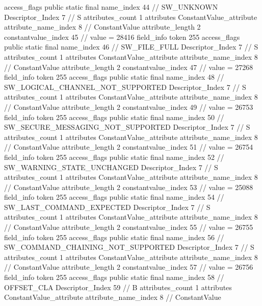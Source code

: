 {{{{{				access_flags	public static final
				name_index	44		// SW_UNKNOWN
				Descriptor_Index	7		// S
				attributes_count	1
				attributes {
				ConstantValue_attribute {
					attribute_name_index	8		// ConstantValue
					attribute_length	2
					constantvalue_index	45		// value = 28416
				}
				}
			}
			field_info {
				token	255
				access_flags	public static final
				name_index	46		// SW_FILE_FULL
				Descriptor_Index	7		// S
				attributes_count	1
				attributes {
				ConstantValue_attribute {
					attribute_name_index	8		// ConstantValue
					attribute_length	2
					constantvalue_index	47		// value = 27268
				}
				}
			}
			field_info {
				token	255
				access_flags	public static final
				name_index	48		// SW_LOGICAL_CHANNEL_NOT_SUPPORTED
				Descriptor_Index	7		// S
				attributes_count	1
				attributes {
				ConstantValue_attribute {
					attribute_name_index	8		// ConstantValue
					attribute_length	2
					constantvalue_index	49		// value = 26753
				}
				}
			}
			field_info {
				token	255
				access_flags	public static final
				name_index	50		// SW_SECURE_MESSAGING_NOT_SUPPORTED
				Descriptor_Index	7		// S
				attributes_count	1
				attributes {
				ConstantValue_attribute {
					attribute_name_index	8		// ConstantValue
					attribute_length	2
					constantvalue_index	51		// value = 26754
				}
				}
			}
			field_info {
				token	255
				access_flags	public static final
				name_index	52		// SW_WARNING_STATE_UNCHANGED
				Descriptor_Index	7		// S
				attributes_count	1
				attributes {
				ConstantValue_attribute {
					attribute_name_index	8		// ConstantValue
					attribute_length	2
					constantvalue_index	53		// value = 25088
				}
				}
			}
			field_info {
				token	255
				access_flags	public static final
				name_index	54		// SW_LAST_COMMAND_EXPECTED
				Descriptor_Index	7		// S
				attributes_count	1
				attributes {
				ConstantValue_attribute {
					attribute_name_index	8		// ConstantValue
					attribute_length	2
					constantvalue_index	55		// value = 26755
				}
				}
			}
			field_info {
				token	255
				access_flags	public static final
				name_index	56		// SW_COMMAND_CHAINING_NOT_SUPPORTED
				Descriptor_Index	7		// S
				attributes_count	1
				attributes {
				ConstantValue_attribute {
					attribute_name_index	8		// ConstantValue
					attribute_length	2
					constantvalue_index	57		// value = 26756
				}
				}
			}
			field_info {
				token	255
				access_flags	public static final
				name_index	58		// OFFSET_CLA
				Descriptor_Index	59		// B
				attributes_count	1
				attributes {
				ConstantValue_attribute {
					attribute_name_index	8		// ConstantValue
}}}}}}}
